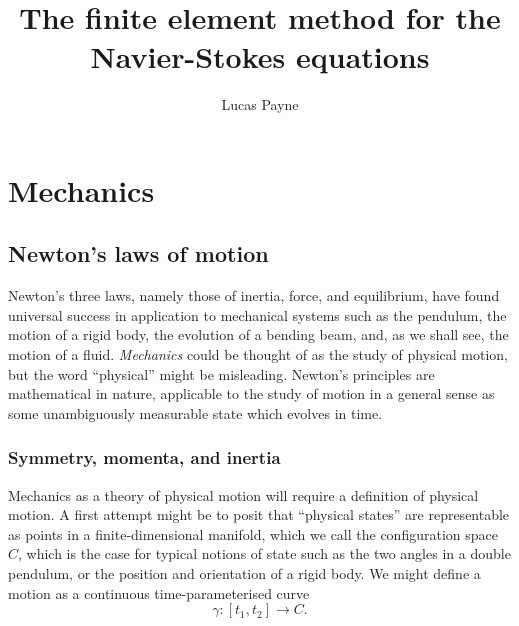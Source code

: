 \documentclass[11pt,a4paper]{memoir}
\begin{document}
\title{\Huge \textbf{The finite element method for the Navier-Stokes equations}}
\author{Lucas Payne}

\maketitle

\tableofcontents

\chapter{Mechanics}
\section{Newton's laws of motion} %

Newton's three laws, namely those of inertia, force, and equilibrium, have found universal success in application
to mechanical systems such as the pendulum, the motion of a rigid body, the evolution of a bending beam, and, as we shall see,
the motion of a fluid. \textit{Mechanics} could be thought of as the study of physical motion, but the word ``physical'' might be misleading.
Newton's principles are mathematical in nature, applicable to the study of motion in a general sense as some unambiguously
measurable state which evolves in time.

\subsection{Symmetry, momenta, and inertia}
Mechanics as a theory of physical motion will require a definition of physical motion. A first attempt might be to posit
that ``physical states'' are representable as points in a finite-dimensional manifold, which we call the configuration space $C$, which is the case for typical
notions of state such as the two angles in a double pendulum, or the position and orientation of a rigid body. We might define a motion as
a continuous time-parameterised curve
    $$\gamma: [t_1, t_2] \rightarrow C.$$
\end{document}
